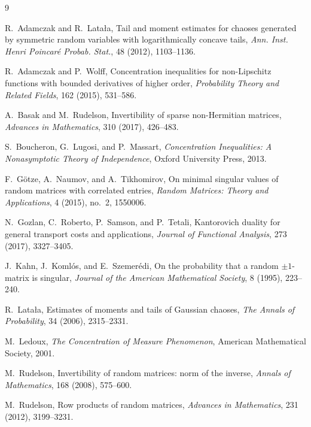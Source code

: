 \documentclass[11pt]{amsart}
\theoremstyle{definition}
\theoremstyle{remark}
\begin{document}
\begin{thebibliography}{9}

R.~Adamczak and R.~Lata\l a,
\newblock Tail and moment estimates for chaoses generated by symmetric random variables with logarithmically concave tails,
\newblock \emph{Ann. Inst. Henri Poincar\'e Probab. Stat.}, 48 (2012), 1103--1136.

R.~Adamczak and P.~Wolff,
\newblock Concentration inequalities for non-Lipschitz functions with bounded derivatives of higher order,
\newblock \emph{Probability Theory and Related Fields}, 162 (2015), 531--586.

A.~Basak and M.~Rudelson,
\newblock Invertibility of sparse non-Hermitian matrices,
\newblock \emph{Advances in Mathematics}, 310 (2017), 426--483.

S.~Boucheron, G.~Lugosi, and P.~Massart,
\newblock \emph{Concentration Inequalities: A Nonasymptotic Theory of Independence},
\newblock Oxford University Press, 2013.

F.~G\"otze, A.~Naumov, and A.~Tikhomirov,
\newblock On minimal singular values of random matrices with correlated entries,
\newblock \emph{Random Matrices: Theory and Applications}, 4 (2015), no.~2, 1550006.

N.~Gozlan, C.~Roberto, P.~Samson, and P.~Tetali,
\newblock Kantorovich duality for general transport costs and applications,
\newblock \emph{Journal of Functional Analysis}, 273 (2017), 3327--3405.

J.~Kahn, J.~Koml\'os, and E.~Szemer\'edi,
\newblock On the probability that a random $\pm1$-matrix is singular,
\newblock \emph{Journal of the American Mathematical Society}, 8 (1995), 223--240.

R.~Lata\l a,
\newblock Estimates of moments and tails of Gaussian chaoses,
\newblock \emph{The Annals of Probability}, 34 (2006), 2315--2331.

M.~Ledoux,
\newblock \emph{The Concentration of Measure Phenomenon},
\newblock American Mathematical Society, 2001.

M.~Rudelson,
\newblock Invertibility of random matrices: norm of the inverse,
\newblock \emph{Annals of Mathematics}, 168 (2008), 575--600.

M.~Rudelson,
\newblock Row products of random matrices,
\newblock \emph{Advances in Mathematics}, 231 (2012), 3199--3231.


\end{thebibliography}
\end{document}
